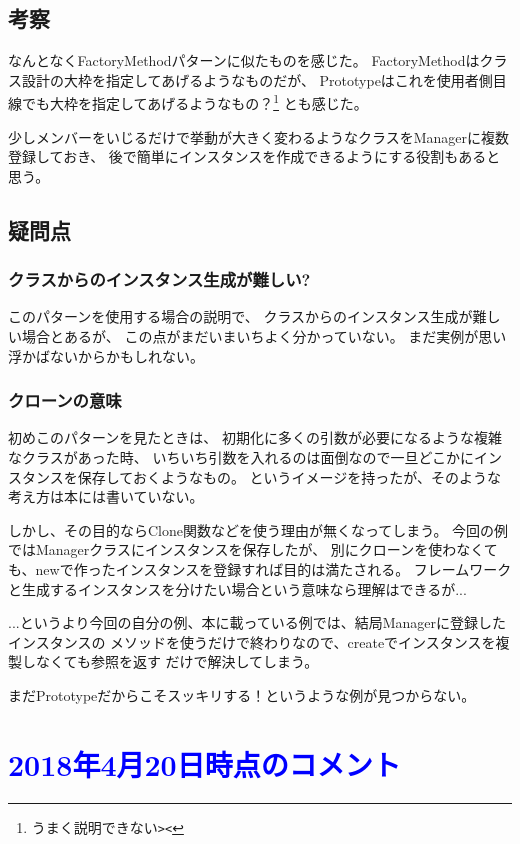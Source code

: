 \documentclass[11pt]{jsarticle}
\begin{document}
		\subsection{考察}
			なんとなくFactoryMethodパターンに似たものを感じた。
			FactoryMethodはクラス設計の大枠を指定してあげるようなものだが、
			Prototypeはこれを使用者側目線でも大枠を指定してあげるようなもの？\footnote{うまく説明できない\verb|><|}
			とも感じた。
			
			少しメンバーをいじるだけで挙動が大きく変わるようなクラスをManagerに複数登録しておき、
			後で簡単にインスタンスを作成できるようにする役割もあると思う。
			
		\color{red}
		\subsection{疑問点}
			\subsubsection{クラスからのインスタンス生成が難しい?}
				このパターンを使用する場合の説明で、
				クラスからのインスタンス生成が難しい場合とあるが、
				この点がまだいまいちよく分かっていない。
				まだ実例が思い浮かばないからかもしれない。
				
			\subsubsection{クローンの意味}
				初めこのパターンを見たときは、
				初期化に多くの引数が必要になるような複雑なクラスがあった時、
				いちいち引数を入れるのは面倒なので一旦どこかにインスタンスを保存しておくようなもの。
				というイメージを持ったが、そのような考え方は本には書いていない。
				
				しかし、その目的ならClone関数などを使う理由が無くなってしまう。
				今回の例ではManagerクラスにインスタンスを保存したが、
				別にクローンを使わなくても、newで作ったインスタンスを登録すれば目的は満たされる。
				フレームワークと生成するインスタンスを分けたい場合という意味なら理解はできるが...
				
				...というより今回の自分の例、本に載っている例では、結局Managerに登録したインスタンスの
				メソッドを使うだけで終わりなので、createでインスタンスを複製しなくても参照を返す
				だけで解決してしまう。
				
				まだPrototypeだからこそスッキリする！というような例が見つからない。

		\color{black}
			
	\section*{\textcolor{blue}{2018年4月20日時点のコメント}}
\end{document}
